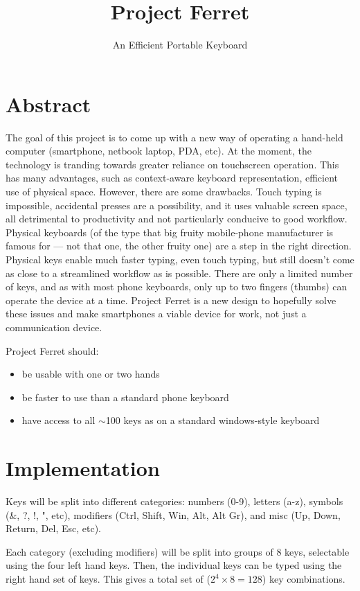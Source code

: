 \documentclass{report}
\title{Project Ferret}
\author{An Efficient Portable Keyboard}
\date{ }
\begin{document}
\maketitle

\tableofcontents

\chapter{Abstract}
The goal of this project is to come up with a new way of operating a hand-held computer (smartphone, netbook laptop, PDA, etc). At the moment, the technology is tranding towards greater reliance on touchscreen operation. This has many advantages, such as context-aware keyboard representation, efficient use of physical space. However, there are some drawbacks. Touch typing is impossible, accidental presses are a possibility, and it uses valuable screen space, all detrimental to productivity and not particularly conducive to good workflow. Physical keyboards (of the type that big fruity mobile-phone manufacturer is famous for --- not that one, the other fruity one) are a step in the right direction. Physical keys enable much faster typing, even touch typing, but still doesn't come as close to a streamlined workflow as is possible. There are only a limited number of keys, and as with most phone keyboards, only up to two fingers (thumbs) can operate the device at a time. Project Ferret is a new design to hopefully solve these issues and make smartphones a viable device for work, not just a communication device.

Project Ferret should:
\begin{itemize}
\item be usable with one or two hands
\item be faster to use than a standard phone keyboard
\item have access to all $\sim$100 keys as on a standard windows-style keyboard
\end{itemize}

\chapter{Implementation}
Keys will be split into different categories: numbers (0-9), letters (a-z), symbols (\&, ?, !, ", etc), modifiers (Ctrl, Shift, Win, Alt, Alt Gr), and misc (Up, Down, Return, Del, Esc, etc).

Each category (excluding modifiers) will be split into groups of 8 keys, selectable using the four left hand keys. Then, the individual keys can be typed using the right hand set of keys. This gives a total set of ($2^4 \times 8 = 128$) key combinations.
\end{document}
